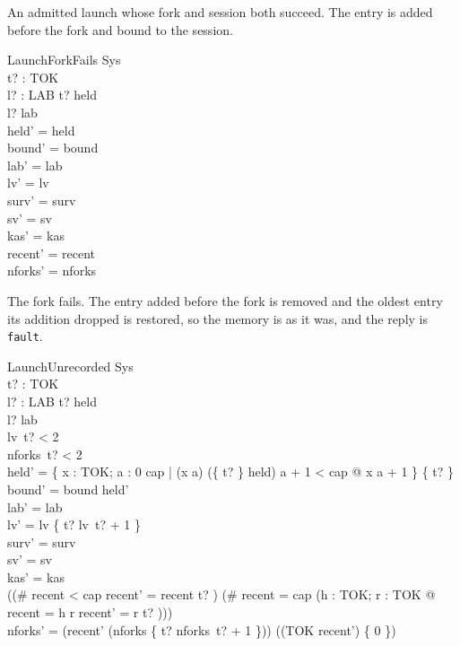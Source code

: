 \documentclass[a4paper,10pt,fleqn]{article}
\begin{document}
An admitted launch whose fork and session both succeed. The entry is added before the fork and bound to the session.

\begin{schema}{LaunchForkFails}
  \Delta Sys \\
  t? : TOK \\ l? : LAB
\where
  t? \notin \dom held \\
  l? \notin \dom lab \\
  held' = held \\
  bound' = bound \\
  lab' = lab \\
  lv' = lv \\
  surv' = surv \\
  sv' = sv \\
  kas' = kas \\
  recent' = recent \\
  nforks' = nforks
\end{schema}

The fork fails. The entry added before the fork is removed and the oldest entry its addition dropped is restored, so the memory is as it was, and the reply is \texttt{fault}.

\begin{schema}{LaunchUnrecorded}
  \Delta Sys \\
  t? : TOK \\ l? : LAB
\where
  t? \notin \dom held \\
  l? \notin \dom lab \\
  lv~t? < 2 \\
  nforks~t? < 2 \\
  held' = \{ x : TOK; a : 0 \upto cap | (x \mapsto a) \in (\{ t? \} \ndres held) \land a + 1 < cap @ x \mapsto a + 1 \} \cup \{ t?  \} \\
  bound' = bound \cap \dom held' \\
  lab' = lab \\
  lv' = lv \oplus \{ t? \mapsto lv~t? + 1 \} \\
  surv' = surv \\
  sv' = sv \\
  kas' = kas \\
  ((\# recent < cap \land recent' = recent \cat \langle t? \rangle) \lor (\# recent = cap \land (\exists h : TOK; r : \seq TOK @ recent = \langle h \rangle \cat r \land recent' = r \cat \langle t? \rangle))) \\
  nforks' = (\ran recent' \dres (nforks \oplus \{ t? \mapsto nforks~t? + 1 \})) \cup ((TOK \setminus \ran recent') \cross \{ 0 \})
\end{schema}
\end{document}
